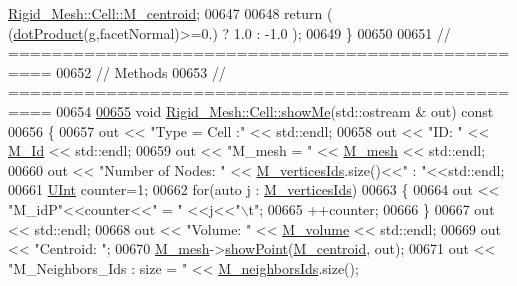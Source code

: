 \begin{DoxyCode}
      \hyperlink{classFVCode3D_1_1Rigid__Mesh_1_1Cell_a5c7626d4a6faec9e43429166dcad110b}{Rigid\_Mesh::Cell::M\_centroid};
00647     
00648         \textcolor{keywordflow}{return} ( (\hyperlink{namespaceFVCode3D_ad07be7f9ed843ca65d02d0303dae6cb4}{dotProduct}(g,facetNormal)>=0.) ? 1.0 : -1.0 );      
00649 \}
00650 
00651 \textcolor{comment}{// ==================================================}
00652 \textcolor{comment}{// Methods}
00653 \textcolor{comment}{// ==================================================}
00654 
\hypertarget{RigidMesh_8cpp_source.tex_l00655}{}\hyperlink{classFVCode3D_1_1Rigid__Mesh_1_1Cell_a0f485e24d514792089e16dd8855e9247}{00655} \textcolor{keywordtype}{void} \hyperlink{classFVCode3D_1_1Rigid__Mesh_1_1Cell_a0f485e24d514792089e16dd8855e9247}{Rigid\_Mesh::Cell::showMe}(std::ostream  & out)\textcolor{keyword}{ const}
00656 \textcolor{keyword}{}\{
00657     out << \textcolor{stringliteral}{"Type = Cell :"} << std::endl;
00658     out << \textcolor{stringliteral}{"ID: "} << \hyperlink{classFVCode3D_1_1Rigid__Mesh_1_1Cell_a69cd2ee5b40a1ccc5cb62c529c7abfb2}{M\_Id} << std::endl;
00659     out << \textcolor{stringliteral}{"M\_mesh = "} << \hyperlink{classFVCode3D_1_1Rigid__Mesh_1_1Cell_ad4a1033c8e506b29487f2be4c4d69c0d}{M\_mesh} << std::endl;
00660     out << \textcolor{stringliteral}{"Number of Nodes: "} << \hyperlink{classFVCode3D_1_1Rigid__Mesh_1_1Cell_a24b548a39f78eec19b66d6fe702409e4}{M\_verticesIds}.size()<<\textcolor{stringliteral}{" : "}<<std::endl;
00661     \hyperlink{namespaceFVCode3D_a4bf7e328c75d0fd504050d040ebe9eda}{UInt} counter=1;
00662     \textcolor{keywordflow}{for}(\textcolor{keyword}{auto} j : \hyperlink{classFVCode3D_1_1Rigid__Mesh_1_1Cell_a24b548a39f78eec19b66d6fe702409e4}{M\_verticesIds})
00663     \{
00664         out << \textcolor{stringliteral}{"M\_idP"}<<counter<<\textcolor{stringliteral}{" = "} <<j<<\textcolor{stringliteral}{"\(\backslash\)t"};
00665         ++counter;
00666     \}
00667     out << std::endl;
00668     out << \textcolor{stringliteral}{"Volume: "} << \hyperlink{classFVCode3D_1_1Rigid__Mesh_1_1Cell_aeda1d5ff8f04d9e93919f454e3f44021}{M\_volume} << std::endl;
00669     out << \textcolor{stringliteral}{"Centroid: "};
00670     \hyperlink{classFVCode3D_1_1Rigid__Mesh_1_1Cell_ad4a1033c8e506b29487f2be4c4d69c0d}{M\_mesh}->\hyperlink{classFVCode3D_1_1Rigid__Mesh_a3bbdb25ce1eddaf66316487bfc05e089}{showPoint}(\hyperlink{classFVCode3D_1_1Rigid__Mesh_1_1Cell_a5c7626d4a6faec9e43429166dcad110b}{M\_centroid}, out);
00671     out << \textcolor{stringliteral}{"M\_Neighbors\_Ids : size = "} << \hyperlink{classFVCode3D_1_1Rigid__Mesh_1_1Cell_a660774a8bb678b874639c9c1ea713bc6}{M\_neighborsIds}.size();

\end{DoxyCode}
